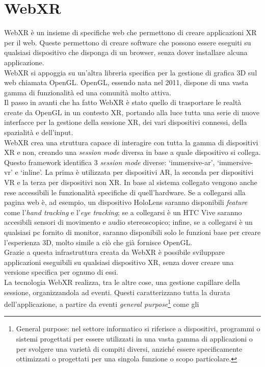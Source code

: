 \section{WebXR}\label{sec:WebXR}
WebXR è un insieme di specifiche web che permettono di creare applicazioni XR per il web. Queste permettono di creare software che possono essere eseguiti su qualsiasi dispositivo
che disponga di un browser, senza dover installare alcuna applicazione\cite{WebXR}.\\
WebXR si appoggia su un'altra libreria specifica per la gestione di grafica 3D sul web chiamata OpenGL. OpenGL, essendo nata nel 2011, dispone di una vasta gamma di funzionalità
ed una comunità molto attiva.\\
Il passo in avanti che ha fatto WebXR è stato quello di trasportare le realtà create da OpenGL in un contesto XR, portando alla luce tutta una serie di nuove interfacce per la gestione
della sessione XR, dei vari dispositivi connessi, della spazialità e dell'input.\\
WebXR crea una struttura capace di interagire con tutta la gamma di dispositivi XR e non, creando una \textit{session mode} diversa in base a quale dispositivo si collega. Questo
framework identifica 3 \textit{session mode} diverse: `immersive-ar', `immersive-vr' e `inline'. La prima è utilizzata per dispositivi AR, la seconda per dispositivi VR e la terza
per dispositivi non XR. In base al sistema collegato vengono anche rese accessibili le funzionalità specifiche di quell'hardware. Se a collegarsi alla pagina web è, ad esempio, un 
dispositivo HoloLens saranno disponibili \textit{feature} come l'\textit{hand tracking} e l'\textit{eye tracking}; se a collegarsi è un HTC Vive saranno accesibili sensori di movimento
e audio stereoscopico; infine, se a collegarsi è un qualsiasi pc fornito di monitor, saranno disponibili solo le funzioni base per creare l'esperienza 3D, molto simile a ciò che 
già fornisce OpenGL.\\
Grazie a questa infrastruttura creata da WebXR è possibile sviluppare applicazioni eseguibili su qualsiasi dispositivo XR, senza dover creare una versione specifica per ognuno di essi.\\
\newline
La tecnologia WebXR realizza, tra le altre cose, una gestione capillare della sessione, organizzandola ad eventi. Questi caratterizzano tutta la durata dell'applicazione, a partire da
eventi \textit{general purpose}\footnote{General purpose: nel settore informatico si riferisce a dispositivi, programmi o sistemi progettati per essere utilizzati in una vasta gamma 
di applicazioni o per svolgere una varietà di compiti diversi, anziché essere specificamente ottimizzati o progettati per una singola funzione o scopo particolare.} come gli 
